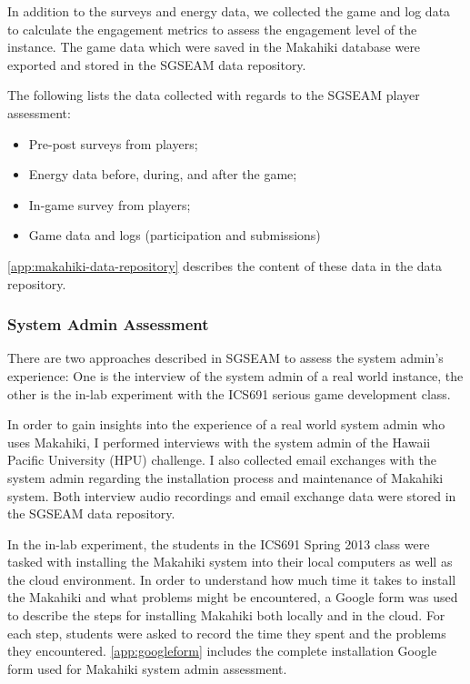 In addition to the surveys and energy data, we collected the game and log data to calculate the engagement metrics to assess the engagement level of the instance. The game data which were saved in the Makahiki database were exported and stored in the SGSEAM data repository.

The following lists the data collected with regards to the SGSEAM player assessment:

\begin{itemize}
\item Pre-post surveys from players;
\item Energy data before, during, and after the game; 
\item In-game survey from players;
\item Game data and logs (participation and submissions)
\end{itemize}

\autoref{app:makahiki-data-repository} describes the content of these data in the data repository.

\subsubsection{System Admin Assessment}

There are two approaches described in SGSEAM to assess the system admin's experience: One is the interview of the system admin of a real world instance, the other is the in-lab experiment with the ICS691 serious game development class.

In order to gain insights into the experience of a real world system admin who uses Makahiki, I performed interviews with the system admin of the Hawaii Pacific University (HPU) challenge.  I also collected email exchanges with the system admin regarding the installation process and maintenance of Makahiki system. Both interview audio recordings and email exchange data were stored in the SGSEAM data repository.

In the in-lab experiment, the students in the ICS691 Spring 2013 class were tasked with installing the Makahiki system into their local computers as well as the cloud environment. In order to understand how much time it takes to install the Makahiki and what problems might be encountered, a Google form was used to describe the steps for installing Makahiki both locally and in the cloud. For each step, students were asked to record the time they spent and the problems they encountered. \autoref{app:googleform} includes the complete installation Google form used for Makahiki system admin assessment.

